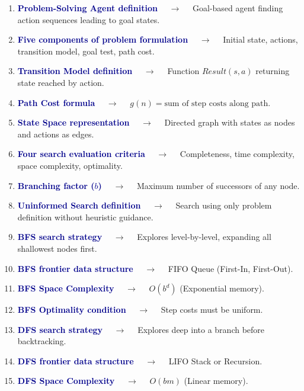 \documentclass[11pt,a4paper]{article}
\begin{document}
\begin{enumerate}[label=\arabic*., leftmargin=*, labelsep=0.8em, itemsep=0.35em, parsep=0.1em, topsep=0.2em]
  \item \textcolor{darkblue}{\textbf{Problem-Solving Agent definition}} $\quad\to\quad$ Goal-based agent finding action sequences leading to goal states.
  \item \textcolor{darkblue}{\textbf{Five components of problem formulation}} $\quad\to\quad$ Initial state, actions, transition model, goal test, path cost.
  \item \textcolor{darkblue}{\textbf{Transition Model definition}} $\quad\to\quad$ Function $Result(s, a)$ returning state reached by action.
  \item \textcolor{darkblue}{\textbf{Path Cost formula}} $\quad\to\quad$ $g(n) = \text{sum of step costs along path}$.
  \item \textcolor{darkblue}{\textbf{State Space representation}} $\quad\to\quad$ Directed graph with states as nodes and actions as edges.
  \item \textcolor{darkblue}{\textbf{Four search evaluation criteria}} $\quad\to\quad$ Completeness, time complexity, space complexity, optimality.
  \item \textcolor{darkblue}{\textbf{Branching factor ($b$)}} $\quad\to\quad$ Maximum number of successors of any node.
  \item \textcolor{darkblue}{\textbf{Uninformed Search definition}} $\quad\to\quad$ Search using only problem definition without heuristic guidance.
  \item \textcolor{darkblue}{\textbf{BFS search strategy}} $\quad\to\quad$ Explores level-by-level, expanding all shallowest nodes first.
  \item \textcolor{darkblue}{\textbf{BFS frontier data structure}} $\quad\to\quad$ FIFO Queue (First-In, First-Out).
  \item \textcolor{darkblue}{\textbf{BFS Space Complexity}} $\quad\to\quad$ $O(b^d)$ (Exponential memory).
  \item \textcolor{darkblue}{\textbf{BFS Optimality condition}} $\quad\to\quad$ Step costs must be uniform.
  \item \textcolor{darkblue}{\textbf{DFS search strategy}} $\quad\to\quad$ Explores deep into a branch before backtracking.
  \item \textcolor{darkblue}{\textbf{DFS frontier data structure}} $\quad\to\quad$ LIFO Stack or Recursion.
  \item \textcolor{darkblue}{\textbf{DFS Space Complexity}} $\quad\to\quad$ $O(bm)$ (Linear memory).

\end{enumerate}
\end{document}
